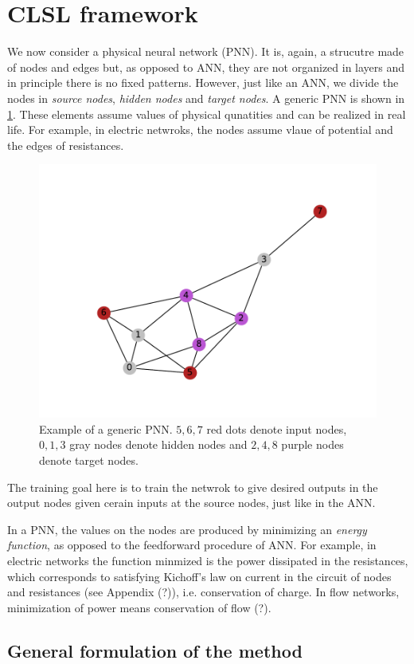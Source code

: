 \documentclass[11pt]{article}
\begin{document}
\newpage

\section{CLSL framework}

We now consider a physical neural network (PNN). It is, again, a strucutre made of nodes and edges but, as opposed to ANN, they are not organized in layers and in principle there is no fixed patterns. However, just like an ANN, we divide the nodes in \textit{source nodes}, \textit{hidden nodes} and \textit{target nodes}. A generic PNN is shown in \cref{fig:general_graph}. These elements assume values of physical qunatities and can be realized in real life. For example, in electric netwroks, the nodes assume vlaue of potential and the edges of resistances.
\begin{figure}[h]
    \centering
    \includegraphics[width=0.6\columnwidth]{figures_tex/general_graph.pdf}
    \caption{Example of a generic PNN. $5,6,7$ red dots denote input nodes, $0,1,3$ gray nodes denote hidden nodes and $2,4,8$ purple nodes denote target nodes.}
    \label{fig:general_graph}
\end{figure} 
The training goal here is to train the netwrok to give desired outputs in the output nodes given cerain inputs at the source nodes, just like in the ANN.

In a PNN, the values on the nodes are produced by minimizing an \textit{energy function}, as opposed to the feedforward procedure of ANN. For example, in electric networks the function minmized is the power dissipated in the resistances, which corresponds to satisfying Kichoff's law on current in the circuit of nodes and resistances (see Appendix (?)), i.e. conservation of charge. In flow networks, minimization of power means conservation of flow (?).

\subsection{General formulation of the method}
\end{document}
